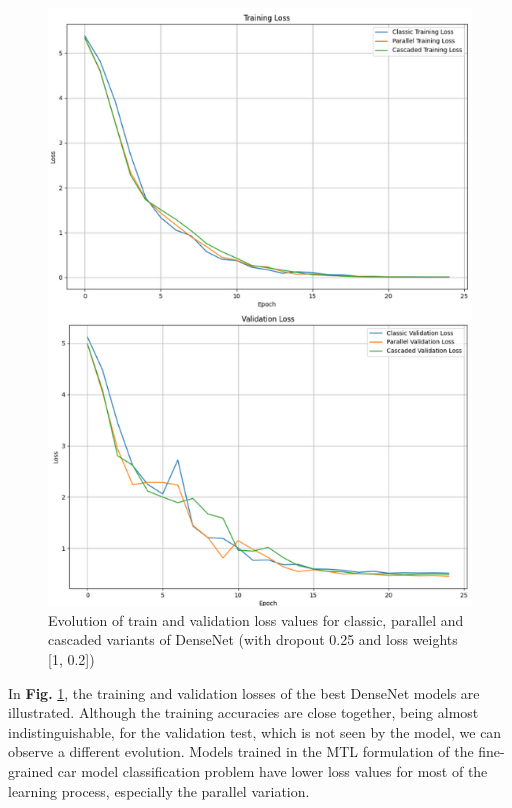 \documentclass[conference]{IEEEtran}
\begin{document}
\begin{figure}[hbt!]
\centering
\centerline{\includegraphics[scale=0.6]{figures/train_val_loss_densenet.png}}
	\caption{Evolution of train and validation loss values for classic, parallel and cascaded variants of DenseNet (with dropout 0.25 and loss weights [1, 0.2])}
	\label{fig:train_val_loss_densenet}
\end{figure}

In \textbf{Fig.} \ref{fig:train_val_loss_densenet}, the training and validation losses of the best DenseNet models are illustrated. Although the training accuracies are close together, being almost indistinguishable, for the validation test, which is not seen by the model, we can observe a different evolution. Models trained in the MTL formulation of the fine-grained car model classification problem have lower loss values for most of the learning process, especially the parallel variation. 
\end{document}

